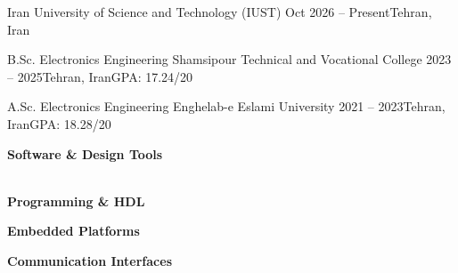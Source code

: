 
{Iran University of Science and Technology (IUST)}
{Oct 2026 -- Present}{Tehran, Iran}
\divider

\cveventgpa
{B.Sc. Electronics Engineering}
{Shamsipour Technical and Vocational College}
{2023 -- 2025}{Tehran, Iran}{GPA: 17.24/20}
\divider

\cveventgpa
{A.Sc. Electronics Engineering}
{Enghelab-e Eslami University}
{2021 -- 2023}{Tehran, Iran}{GPA: 18.28/20}


\smallskip
\textbf{Software \& Design Tools}\\
\smallskip
{}\\




\smallskip
\textbf{Programming \& HDL}
\smallskip
\\
\cvtag{\LaTeX}

\smallskip
\textbf{Embedded Platforms}
\smallskip
\\


\smallskip
\textbf{Communication Interfaces}
\smallskip
\\





